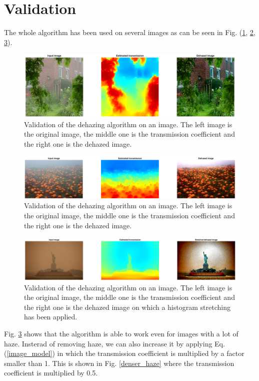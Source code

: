 \documentclass[conference]{IEEEtran}
\begin{document}
\section{Validation}
The whole algorithm has been used on several images as can be seen in Fig. (\ref{validation1}, \ref{validation2}, \ref{validation3}).
\begin{figure}
    \centering
    \includegraphics[width=\linewidth]{img/validation1.png}
    \caption{Validation of the dehazing algorithm on an image. The left image is the original image, the middle one is the transmission coefficient and the right one is the dehazed image.}
    \label{validation1}
\end{figure}
\begin{figure}
    \centering
    \includegraphics[width=\linewidth]{img/validation2.png}
    \caption{Validation of the dehazing algorithm on an image. The left image is the original image, the middle one is the transmission coefficient and the right one is the dehazed image.}
    \label{validation2}
\end{figure}
\begin{figure}
    \centering
    \includegraphics[width=\linewidth]{img/validation3.png}
    \caption{Validation of the dehazing algorithm on an image. The left image is the original image, the middle one is the transmission coefficient and the right one is the dehazed image on which a histogram stretching has been applied.}
    \label{validation3}
\end{figure}
Fig. \ref{validation3} shows that the algorithm is able to work even for images with a lot of haze. Insterad of removing haze, we can also increase it by applying Eq. (\ref{image_model}) in which the transmission coefficient is multiplied by a factor smaller than 1. This is shown in Fig. \ref{denser_haze} where the transmission coefficient is multiplied by 0.5.
\end{document}
